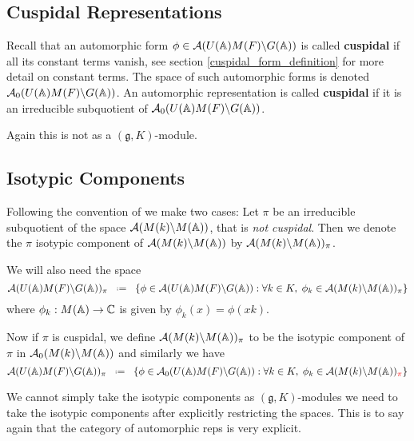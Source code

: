 \subsection{Cuspidal Representations}
Recall that an automorphic form \(\phi\in \mathcal{A}(U(\A)M(F) \backslash G(\A))\) is called \textbf{cuspidal}  if all its constant terms vanish, see section \ref{cuspidal_form_definition} for more detail on constant terms.
The space of such automorphic forms is denoted \(\mathcal{A}_0(U(\A)M(F) \backslash G(\A))\). An automorphic representation is called \textbf{cuspidal} if it is an irreducible subquotient of \(\mathcal{A}_0(U(\A)M(F) \backslash G(\A))\).

\begin{remark}
    Again this is not as a \((\mathfrak{g}, K)\)-module.
\end{remark}

\subsection{Isotypic Components}\label{automorphic_isotypic_subspaces}
Following the convention of \cite[II.1]{moeglinSpectralDecompositionEisenstein1995} we make two cases:
Let \(\pi\) be an irreducible subquotient of the space \(\mathcal{A}(M(k) \backslash M(\A))\), that is \textit{not cuspidal}. Then we denote the \(\pi\) isotypic component of \(\mathcal{A}(M(k) \backslash M(\A))\) by \(\mathcal{A}(M(k) \backslash M(\A))_\pi\).

We will also need the space 
\[\mathcal{A}(U(\A)M(F) \backslash G(\A))_\pi \defeq \{\phi \in \mathcal{A}(U(\A)M(F) \backslash G(\A)) : \forall k\in K, \; \phi_k\in\mathcal{A}(M(k) \backslash M(\A))_\pi \}\]
where \(\phi_k: M(\A) \to \C\) is given by \(\phi_k(x) = \phi(xk)\).

Now if \(\pi\) is cuspidal, we define \(\mathcal{A}(M(k) \backslash M(\A))_\pi\) to be the isotypic component of \(\pi\) in \(\mathcal{A}_0(M(k) \backslash M(\A))\) and similarly we have 
\[\mathcal{A}(U(\A)M(F) \backslash G(\A))_\pi \defeq \{\phi \in \mathcal{A}_0(U(\A)M(F) \backslash G(\A)) : \forall k\in K, \; \phi_k\in\mathcal{A}(M(k) \backslash M(\A))_{\textcolor{red}{\pi}} \}\]
\begin{remark}
    We cannot simply take the isotypic components as \((\mathfrak{g}, K)\)-modules we need to take the isotypic components after explicitly restricting the spaces. This is to say again that the category of automorphic reps is very explicit. 
\end{remark}

